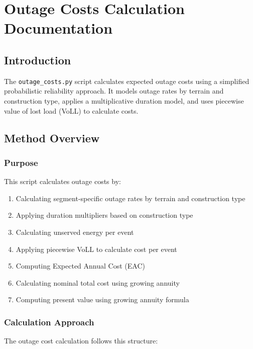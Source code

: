\documentclass[ctcc_full_documentation.tex]{subfiles}
\begin{document}
\chapter{Outage Costs Calculation Documentation}

\section{Introduction}

The \texttt{outage\_costs.py} script calculates expected outage costs using a simplified probabilistic reliability approach. It models outage rates by terrain and construction type, applies a multiplicative duration model, and uses piecewise value of lost load (VoLL) to calculate costs.

\section{Method Overview}

\subsection{Purpose}

This script calculates outage costs by:
\begin{enumerate}
    \item Calculating segment-specific outage rates by terrain and construction type
    \item Applying duration multipliers based on construction type
    \item Calculating unserved energy per event
    \item Applying piecewise VoLL to calculate cost per event
    \item Computing Expected Annual Cost (EAC)
    \item Calculating nominal total cost using growing annuity
    \item Computing present value using growing annuity formula
\end{enumerate}

\subsection{Calculation Approach}

The outage cost calculation follows this structure:
\end{document}
